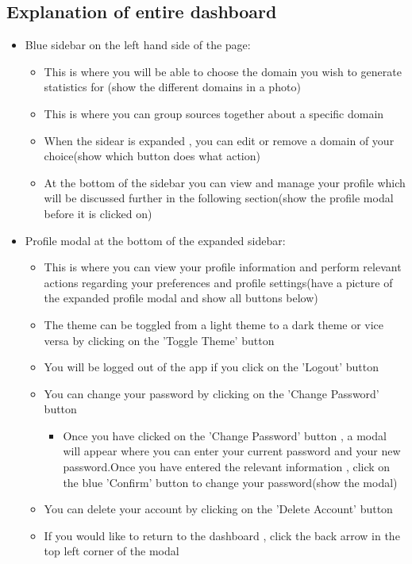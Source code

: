 \documentclass[12pt]{article}
\begin{document}
\subsection{Explanation of entire dashboard}
\begin{itemize}
    \item Blue sidebar on the left hand side of the page:
    \begin{itemize}
        \item This is where you will be able to choose the domain you wish to generate statistics for (show the different domains in a photo)
        \item This is where you can group sources together about a specific domain
        \item When the sidear is expanded , you can edit or remove a domain of your choice(show which button does what action)
        \item At the bottom of the sidebar you can view and manage your profile which will be discussed further in the following section(show the profile modal before it is clicked on)
    \end{itemize}
    \item Profile modal at the bottom of the expanded sidebar:
    \begin{itemize}
        \item This is where you can view your profile information and perform relevant actions regarding your preferences and profile settings(have a picture of the expanded profile modal and show all buttons below)
        \item The theme can be toggled from a light theme to a dark theme or vice versa by clicking on the 'Toggle Theme' button
        \item You will be logged out of the app if you click on the 'Logout' button
        \item You can change your password by clicking on the 'Change Password' button
        \begin{itemize}
            \item Once you have clicked on the 'Change Password' button , a modal will appear where you can enter your current password and your new password.Once you have entered the relevant information , click on the blue 'Confirm' button to change your password(show the modal)
        \end{itemize}
        \item You can delete your account by clicking on the 'Delete Account' button
        \item If you would like to return to the dashboard , click the back arrow in the top left corner of the modal

\end{itemize}
\end{itemize}
\end{document}
